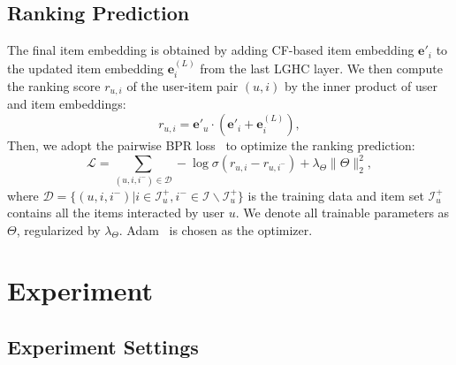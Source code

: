 \subsection{Ranking Prediction}
The final item embedding is obtained by adding CF-based item embedding $\mathbf{e}'_i$ to the updated item embedding $\mathbf{e}^{(L)}_i$ from the last LGHC layer. We then compute the ranking score $r_{u,i}$ of the user-item pair $(u,i)$ by the inner product of user and item embeddings:
\begin{equation}
r_{u,i} = \mathbf{e}'_{u}\cdot (\mathbf{e}'_{i} + \mathbf{e}^{(L)}_i),
\end{equation}
Then, we adopt the pairwise BPR loss~\cite{BPR} to optimize the ranking prediction:
\begin{equation}
    \mathcal{L}=\sum\limits_{(u,i,i^-)\in \mathcal{D}} -\log\sigma(r_{u,i}-r_{u,i^-}) + \lambda_\Theta\|\Theta\|^2_2,
\end{equation}
where $\mathcal{D}=\{(u,i,i^-)|i\in \mathcal{I}^{+}_{u}, i^-\in \mathcal{I}\backslash\mathcal{I}^{+}_{u}\}$ is the training data and item set $\mathcal{I}^{+}_{u}$ contains all the items interacted by user $u$. We denote all trainable parameters as $\Theta$, regularized by $\lambda_\Theta$. Adam~\cite{Adam} is chosen as the optimizer.

\section{Experiment}
\subsection{Experiment Settings}
